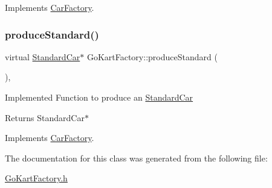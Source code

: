 Implements \mbox{\hyperlink{class_car_factory_a6ea0703f2e692c09dea7a3602836410f}{Car\+Factory}}.

\mbox{\label{class_go_kart_factory_abd7bc7f04d3515169d2edb6ff51996ba}} 
\subsubsection{\texorpdfstring{produce\+Standard()}{produceStandard()}}
{\footnotesize\ttfamily virtual \mbox{\hyperlink{class_standard_car}{Standard\+Car}}$\ast$ Go\+Kart\+Factory\+::produce\+Standard (\begin{DoxyParamCaption}{ }\end{DoxyParamCaption})\hspace{0.3cm}{\ttfamily [inline]}, {\ttfamily [virtual]}}

Implemented Function to produce an \mbox{\hyperlink{class_standard_car}{Standard\+Car}} \begin{DoxyReturn}{Returns}
Standard\+Car$\ast$ 
\end{DoxyReturn}


Implements \mbox{\hyperlink{class_car_factory_a34ffd5237b689fa31a9a593796d296f2}{Car\+Factory}}.



The documentation for this class was generated from the following file\+:\begin{DoxyCompactItemize}
\item 
\mbox{\hyperlink{_go_kart_factory_8h}{Go\+Kart\+Factory.\+h}}\end{DoxyCompactItemize}
